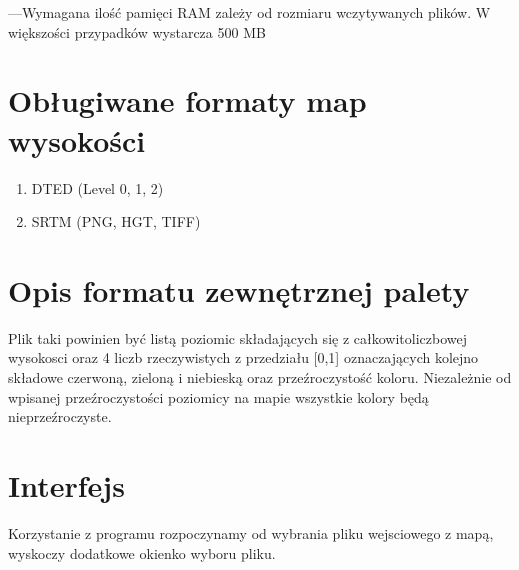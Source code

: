 \documentclass[a4paper]{article}
\begin{document}
---Wymagana ilość pamięci RAM zależy od rozmiaru wczytywanych plików. W większości przypadków wystarcza 500 MB

  \section{Obługiwane formaty map wysokości}
  
  	\begin{enumerate}
	\item{DTED (Level 0, 1, 2)}
	\item{SRTM (PNG, HGT, TIFF)}
	\end{enumerate}
	
\section{Opis formatu zewnętrznej palety}
Plik taki powinien być listą poziomic składających się z całkowitoliczbowej wysokosci oraz 4 liczb rzeczywistych z przedziału [0,1] oznaczających kolejno składowe czerwoną, zieloną i niebieską oraz przeźroczystość koloru. Niezależnie od wpisanej przeźroczystości poziomicy na mapie wszystkie kolory będą nieprzeźroczyste. 
 \section{Interfejs}
 Korzystanie z programu rozpoczynamy od wybrania pliku wejsciowego z mapą, wyskoczy dodatkowe okienko wyboru pliku.
\end{document}
